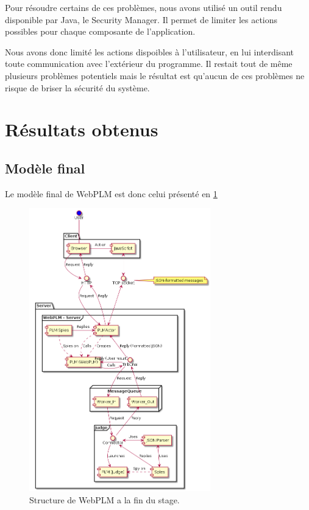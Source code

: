 \documentclass[stage]{tnreport}
\begin{document}
Pour résoudre certains de ces problèmes, nous avons utilisé un outil rendu disponible par Java, le Security Manager. Il permet de limiter les actions possibles pour chaque composante de l'application.

Nous avons donc limité les actions dispoibles à l'utilisateur, en lui interdisant toute communication avec l'extérieur du programme. Il restait tout de même plusieurs problèmes potentiels mais le résultat est qu'aucun de ces problèmes ne risque de briser la sécurité du système.

\section{Résultats obtenus}

\subsection{Modèle final}

Le modèle final de WebPLM est donc celui présenté en \ref{fig:wplmUP5}
\begin{figure}[h]
	\centering
		\includegraphics[width=0.7\textwidth]{figures/WebPLM-uml-cp3}
	\caption{Structure de WebPLM a la fin du stage.}
	\label{fig:wplmUP5}
\end{figure}
\end{document}
